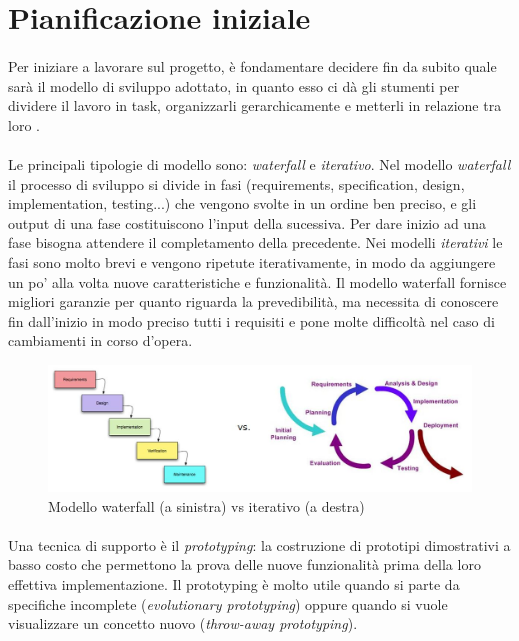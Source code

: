 \documentclass[11pt,a4paper,english]{article}
\begin{document}
\section{Pianificazione iniziale}

\paragraph{} Per iniziare a lavorare sul progetto, è fondamentare decidere fin da subito quale sarà il modello di sviluppo adottato, in quanto esso ci dà gli stumenti per dividere il lavoro in task, organizzarli gerarchicamente e metterli in relazione tra loro  \cite{modelli_sviluppo, agile_manifesto}. 

\paragraph{} Le principali tipologie di modello sono: \emph{waterfall} e \emph{iterativo}. Nel modello \emph{waterfall} il processo di sviluppo si divide in fasi (requirements, specification, design, implementation, testing...) che vengono svolte in un ordine ben preciso, e gli output di una fase costituiscono l'input della sucessiva. Per dare inizio ad una fase bisogna attendere il completamento della precedente. Nei modelli \emph{iterativi} le fasi sono molto brevi e vengono ripetute iterativamente, in modo da aggiungere un po' alla volta nuove caratteristiche e funzionalità. Il modello waterfall fornisce migliori garanzie per quanto riguarda la prevedibilità, ma necessita di conoscere fin dall'inizio in modo preciso tutti i requisiti e pone molte difficoltà nel caso di cambiamenti in corso d'opera.

\begin{figure}[H]
    \centering
    \includegraphics[width=1.0\textwidth]{img/waterfall_vs_iterativo.jpeg}
    \caption{Modello waterfall (a sinistra) vs iterativo (a destra)}
\end{figure}

\paragraph{} Una tecnica di supporto è il \emph{prototyping}: la costruzione di prototipi dimostrativi a basso costo che permettono la prova delle nuove funzionalità prima della loro effettiva implementazione. Il prototyping è molto utile quando si parte da specifiche incomplete (\emph{evolutionary prototyping}) oppure quando si vuole visualizzare un concetto nuovo (\emph{throw-away prototyping}). 
\end{document}
